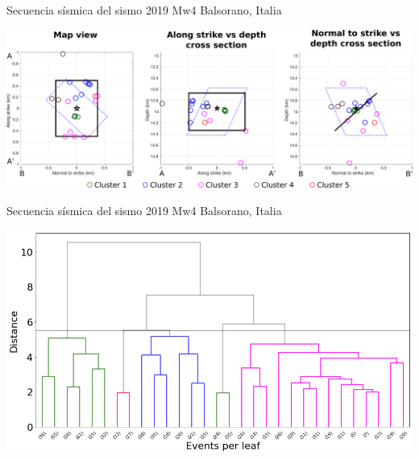 \documentclass{beamer}
\begin{document}
\begin{frame}
 {Secuencia s\'ismica del sismo 2019 Mw4 Balsorano, Italia}

 \begin{minipage}{1\linewidth}
  \centering \includegraphics[width=1\linewidth]{images/S6_templates_per_cluster_map.pdf}
 \end{minipage} 
 
\end{frame}

\begin{frame}
 {Secuencia s\'ismica del sismo 2019 Mw4 Balsorano, Italia}

 \begin{minipage}{1\linewidth}
  \centering \includegraphics[width=1\linewidth]{images/dendrogram_balsorano.png}
 \end{minipage} 
 
\end{frame}
\end{document}
